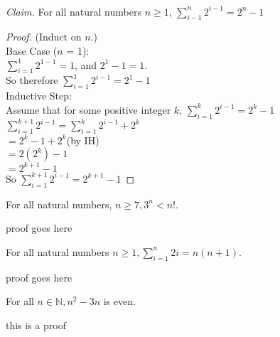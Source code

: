 \documentclass[answers,12pt]{exam}
\newcommand\tab[1][1cm]{\hspace*{#1}}
\begin{document}
\begin{questions}
\begin{solution} \\
	\textit{Claim.} For all natural numbers $n \geq 1$, $\displaystyle\sum_{i-1}^{n} 2^{i-1} = 2^{n} - 1$\\
		\begin{proof}(Induct on $n$.)\\
			Base Case ($n$ = 1):\\
			\tab $\displaystyle\sum_{i=1}^{1} 2^{1-1} = 1$, and $2^1 - 1 = 1$.\\
			\tab So therefore $\displaystyle\sum_{i=1}^{1} 2^{i-1} = 2^1 - 1$\\
			Inductive Step:\\
			\tab Assume that for some positive integer $k$, $\displaystyle\sum_{i=1}^{k} 2^{i-1} = 2^k - 1$\\
			\tab \tab \tab $\displaystyle\sum_{i=1}^{k+1} 2^{i-1} = \displaystyle\sum_{i=1}^{k} 2^{i-1} + 2^{k}$\\
			\tab \tab \tab $=2^k -1 + 2^k$\hfill (by IH)\\
			\tab \tab \tab $=2(2^k)-1$\\
			\tab \tab \tab $=2^{k+1}-1$\\
			\tab So $\displaystyle\sum_{i=1}^{k+1} 2^{i-1} = 2^{k+1} -1$
		\end{proof}
\end{solution}

\question[some]
For all natural numbers, $n \geq 7, 3^{n} < n!$.
		

\begin{solution}
	proof goes here
\end{solution}

\question[some] 
	For all natural numbers $n \geq 1, \displaystyle\sum_{i=1}^{n} 2i = n(n+1)$.


\begin{solution}
	proof goes here
\end{solution}

\question[some]
	For all $n \in \mathbb{N}, n^{2} - 3n$ is even.


\begin{solution}
	this is a proof
\end{solution}
 
\end{questions}
\end{document}
